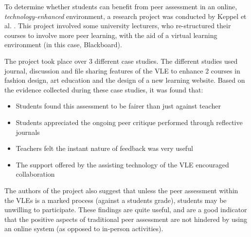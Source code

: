 \documentclass[a4paper,11pt]{report}
\begin{document}
To determine whether students can benefit from peer assessment in an online, \textit{technology-enhanced} environment, a research project was conducted by Keppel et al. \cite{keppell_peer_2006}. This project involved some university lecturers, who re-structured their courses to involve more peer learning, with the aid of a virtual learning environment (in this case, Blackboard).\par
The project took place over 3 different case studies. The different studies used journal, discussion and file sharing features of the VLE to enhance 2 courses in fashion design, art education and the design of a new learning website. Based on the evidence collected during these case studies, it was found that:
\begin{itemize}
 \item Students found this assessment to be fairer than just against teacher
 \item Students appreciated the ongoing peer critique performed through reflective journals
 \item Teachers felt the instant nature of feedback was very useful
 \item The support offered by the assisting technology of the VLE encouraged collaboration
\end{itemize}
The authors of the project also suggest that unless the peer assessment within the VLEs is a marked process (against a students grade), students may be unwilling to participate. These findings are quite useful, and are a good indicator that the positive aspects of traditional peer assessment are not hindered by using an online system (as opposed to in-person activities).\par
\end{document}
